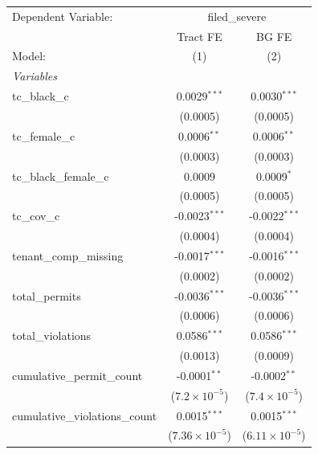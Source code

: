 \begin{tabular}{lcc}
   \tabularnewline \midrule \midrule
   Dependent Variable: & \multicolumn{2}{c}{filed\_severe}\\
                                   & Tract FE                & BG FE \\   
   Model:                          & (1)                     & (2)\\  
   \midrule
   \emph{Variables}\\
   tc\_black\_c                    & 0.0029$^{***}$          & 0.0030$^{***}$\\   
                                   & (0.0005)                & (0.0005)\\   
   tc\_female\_c                   & 0.0006$^{**}$           & 0.0006$^{**}$\\   
                                   & (0.0003)                & (0.0003)\\   
   tc\_black\_female\_c            & 0.0009                  & 0.0009$^{*}$\\   
                                   & (0.0005)                & (0.0005)\\   
   tc\_cov\_c                      & -0.0023$^{***}$         & -0.0022$^{***}$\\   
                                   & (0.0004)                & (0.0004)\\   
   tenant\_comp\_missing           & -0.0017$^{***}$         & -0.0016$^{***}$\\   
                                   & (0.0002)                & (0.0002)\\   
   total\_permits                  & -0.0036$^{***}$         & -0.0036$^{***}$\\   
                                   & (0.0006)                & (0.0006)\\   
   total\_violations               & 0.0586$^{***}$          & 0.0586$^{***}$\\   
                                   & (0.0013)                & (0.0009)\\   
   cumulative\_permit\_count       & -0.0001$^{**}$          & -0.0002$^{**}$\\   
                                   & ($7.2\times 10^{-5}$)   & ($7.4\times 10^{-5}$)\\    
   cumulative\_violations\_count   & 0.0015$^{***}$          & 0.0015$^{***}$\\   
                                   & ($7.36\times 10^{-5}$)  & ($6.11\times 10^{-5}$)\\    

\end{tabular}

